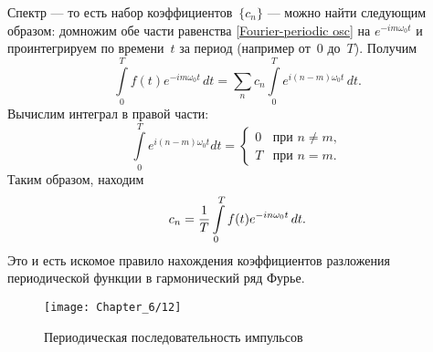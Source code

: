 Спектр --- то есть набор коэффициентов~$\{c_n\}$ ---
можно найти следующим образом: домножим обе части равенства
\eqref{Fourier-periodic osc} на $e^{-im\omega_0 t}$ и
проинтегрируем по времени~$t$ за период (например от~$0$ до~$T$). Получим
\begin{equation*}
    \int\limits_{0}^{T} f(t)e^{-im\omega_0t}\,dt=\sum_n c_n\int\limits_{0}^{T}
e^{i(n-m)\omega_0 t}\,dt.
\end{equation*}
Вычислим интеграл в правой части:
\begin{equation*}
    \int\limits_{0}^{T}e^{i(n-m)\omega_0 t}dt =
    \begin{cases}
        0 & \text{при~}n\ne m,\\
        T & \text{при~}n = m.
    \end{cases}
\end{equation*}
Таким образом, находим
\begin{equation}
    \eqmark{fourier-coeff}
    c_n=\frac{1}{T}\int\limits_{0}^{T} f(t)e^{-in\omega_0 t}\,dt.
\end{equation}
Это и есть искомое правило нахождения коэффициентов разложения периодической
функции в гармонический ряд Фурье.

\begin{wrapfigure}[10]{o}{0.5\textwidth}
    \centering
    \texttt{[image: Chapter\_6/12]}
    \caption{Периодическая последовательность импульсов}
\end{wrapfigure}

